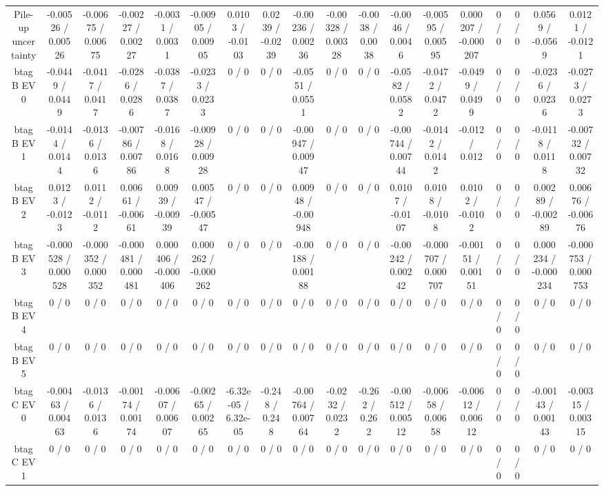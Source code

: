 \documentclass[10pt]{article}
\begin{document}
\begin{table}[htbp]
\begin{center}
\begin{tabular}{|c|c|c|c|c|c|c|c|c|c|c|c|c|c|c|c|c|c|}
  Pile-up uncertainty & -0.00526 / 0.00526 & -0.00675 / 0.00675 & -0.00227 / 0.00227 & -0.0031 / 0.0031 & -0.00905 / 0.00905 & 0.0103 / -0.0103 & 0.0239 / -0.0239 & -0.00236 / 0.00236 & -0.00328 / 0.00328 & -0.0038 / 0.0038 & -0.0046 / 0.0046 & -0.00595 / 0.00595 & 0.000207 / -0.000207 & 0 / 0 & 0 / 0 & 0.0569 / -0.0569 & 0.0121 / -0.0121 \\ 
  btag B EV 0 & -0.0449 / 0.0449 & -0.0417 / 0.0417 & -0.0286 / 0.0286 & -0.0387 / 0.0387 & -0.0233 / 0.0233 & 0 / 0 & 0 / 0 & -0.0551 / 0.0551 & 0 / 0 & 0 / 0 & -0.0582 / 0.0582 & -0.0472 / 0.0472 & -0.0499 / 0.0499 & 0 / 0 & 0 / 0 & -0.0236 / 0.0236 & -0.0273 / 0.0273 \\ 
  btag B EV 1 & -0.0144 / 0.0144 & -0.0136 / 0.0136 & -0.00786 / 0.00786 & -0.0168 / 0.0168 & -0.00928 / 0.00928 & 0 / 0 & 0 / 0 & -0.00947 / 0.00947 & 0 / 0 & 0 / 0 & -0.00744 / 0.00744 & -0.0142 / 0.0142 & -0.012 / 0.012 & 0 / 0 & 0 / 0 & -0.0118 / 0.0118 & -0.00732 / 0.00732 \\ 
  btag B EV 2 & 0.0123 / -0.0123 & 0.0112 / -0.0112 & 0.00661 / -0.00661 & 0.00939 / -0.00939 & 0.00547 / -0.00547 & 0 / 0 & 0 / 0 & 0.00948 / -0.00948 & 0 / 0 & 0 / 0 & 0.0107 / -0.0107 & 0.0108 / -0.0108 & 0.0102 / -0.0102 & 0 / 0 & 0 / 0 & 0.00289 / -0.00289 & 0.00676 / -0.00676 \\ 
  btag B EV 3 & -0.000528 / 0.000528 & -0.000352 / 0.000352 & -0.000481 / 0.000481 & 0.000406 / -0.000406 & 0.000262 / -0.000262 & 0 / 0 & 0 / 0 & -0.00188 / 0.00188 & 0 / 0 & 0 / 0 & -0.00242 / 0.00242 & -0.000707 / 0.000707 & -0.00151 / 0.00151 & 0 / 0 & 0 / 0 & 0.000234 / -0.000234 & -0.000753 / 0.000753 \\ 
  btag B EV 4 & 0 / 0 & 0 / 0 & 0 / 0 & 0 / 0 & 0 / 0 & 0 / 0 & 0 / 0 & 0 / 0 & 0 / 0 & 0 / 0 & 0 / 0 & 0 / 0 & 0 / 0 & 0 / 0 & 0 / 0 & 0 / 0 & 0 / 0 \\ 
  btag B EV 5 & 0 / 0 & 0 / 0 & 0 / 0 & 0 / 0 & 0 / 0 & 0 / 0 & 0 / 0 & 0 / 0 & 0 / 0 & 0 / 0 & 0 / 0 & 0 / 0 & 0 / 0 & 0 / 0 & 0 / 0 & 0 / 0 & 0 / 0 \\ 
  btag C EV 0 & -0.00463 / 0.00463 & -0.0136 / 0.0136 & -0.00174 / 0.00174 & -0.00607 / 0.00607 & -0.00265 / 0.00265 & -6.32e-05 / 6.32e-05 & -0.248 / 0.248 & -0.00764 / 0.00764 & -0.0232 / 0.0232 & -0.262 / 0.262 & -0.00512 / 0.00512 & -0.00658 / 0.00658 & -0.00612 / 0.00612 & 0 / 0 & 0 / 0 & -0.00143 / 0.00143 & -0.00315 / 0.00315 \\ 
  btag C EV 1 & 0 / 0 & 0 / 0 & 0 / 0 & 0 / 0 & 0 / 0 & 0 / 0 & 0 / 0 & 0 / 0 & 0 / 0 & 0 / 0 & 0 / 0 & 0 / 0 & 0 / 0 & 0 / 0 & 0 / 0 & 0 / 0 & 0 / 0 \\ 

\end{tabular}
\end{center}
\end{table}
\end{document}
